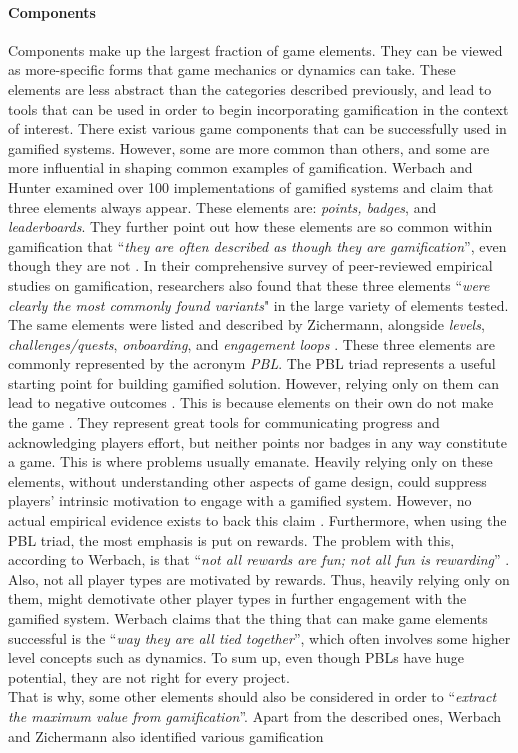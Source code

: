 \paragraph{Components}
Components make up the largest fraction of game elements. They can be viewed as more-specific forms that game mechanics or dynamics can take. These elements are less abstract than the categories described previously, and lead to tools that can be used in order to begin incorporating gamification in the context of interest. There exist various game components that can be successfully used in gamified systems. However, some are more common than others, and some are more influential in shaping common examples of gamification. Werbach and Hunter \cite{werbach2012win} examined over 100 implementations of gamified systems and claim that three elements always appear. These elements are: \textit{points, badges}, and \textit{leaderboards}. They further point out how these elements are so common within gamification that ``\textit{they are often described as though they are gamification}'', even though they are not \cite{werbach2012win}.  In their comprehensive survey of peer-reviewed empirical studies on gamification, researchers \cite{hamari2014does} also found that these three elements ``\textit{were clearly the most commonly found variants}" in the large variety of elements tested. The same elements were listed and described by Zichermann, alongside \textit{levels}, \textit{challenges/quests}, \textit{onboarding}, and \textit{engagement loops} \cite{zichermann2011gamification}. These three elements are commonly represented by the acronym \textit{PBL}. The PBL triad represents a useful starting point for building gamified solution. However, relying only on them can lead to negative outcomes \cite{werbach2012win}. This is because elements on their own do not make the game \cite{werbach2012win, WerbachCoursera}. They represent great tools for communicating progress and acknowledging players effort, but neither points nor badges in any way constitute a game. This is where problems usually emanate. Heavily relying only on these elements, without understanding other aspects of game design, could suppress players' intrinsic motivation to engage with a gamified system. However, no actual empirical evidence exists to back this claim \cite{mekler2013points}. Furthermore, when using the PBL triad, the most emphasis is put on rewards. The problem with this, according to Werbach, is that ``\textit{not all rewards are fun; not all fun is rewarding}'' \cite{WerbachCoursera}. Also, not all player types are motivated by rewards. Thus, heavily relying only on them, might demotivate other player types in further engagement with the gamified system. Werbach claims that the thing that can make game elements successful is the ``\textit{way they are all tied together}'', which often involves some higher level concepts such as dynamics. To sum up, even though PBLs have huge potential, they are not right for every project.\\ That is why, some other elements should also be considered in order to ``\textit{extract the maximum value from gamification}''\cite{werbach2012win}. Apart from the described ones, Werbach and Zichermann also identified various gamification 